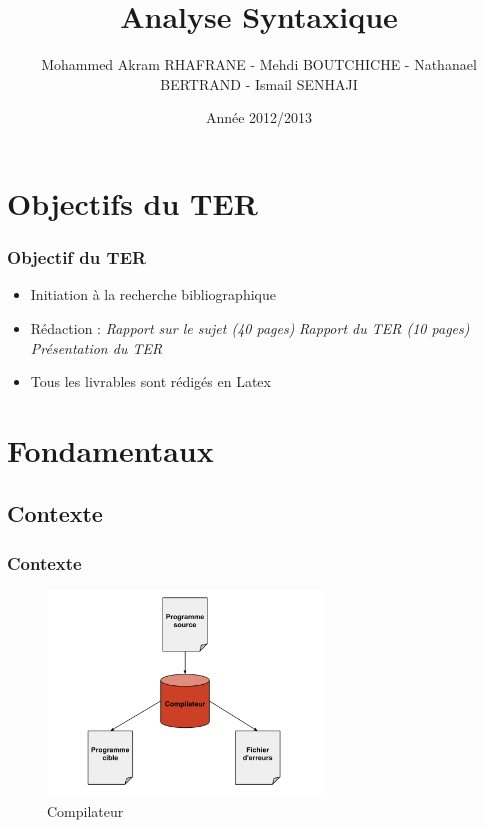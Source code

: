 \documentclass{beamer}
\title[Analyse Syntaxique]{Analyse Syntaxique}
\author{Mohammed Akram RHAFRANE - Mehdi BOUTCHICHE - Nathanael BERTRAND - Ismail SENHAJI}
\institute{Université de Toulouse III/IRIT}
\date{Année 2012/2013}
\begin{document}
\begin{frame}
  \titlepage
\end{frame}


\section{Objectifs du TER}\label{sec:Objectifs}

\begin{frame}\frametitle{Objectif du TER}

\begin{itemize}
\item Initiation à la recherche bibliographique\newline

\item Rédaction :\newline
			\subitem \textit{Rapport sur le sujet (40 pages)}\newline
			\subitem \textit{Rapport du TER (10 pages)}\newline
			\subitem \textit{Présentation du TER}\newline			

\item Tous les livrables sont rédigés en Latex
\end{itemize}

\end{frame}

\section{Fondamentaux}

\subsection{Contexte}

\begin{frame}\frametitle{Contexte}

\begin{figure}[h]
	\centering
		\includegraphics[width=0.65\textwidth]{compilateur.png}
	\caption{Compilateur}
	\label{fig:compilateur}
\end{figure}\FloatBarrier

\end{frame}
\end{document}
